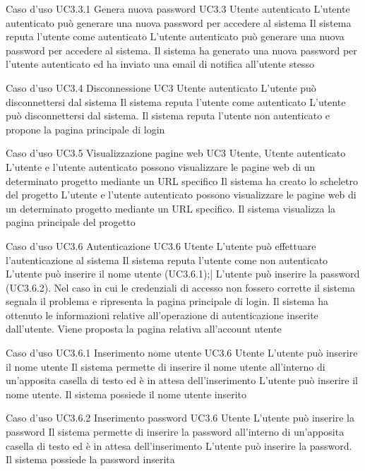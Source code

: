 \UCtitle
{Caso d'uso UC3.3.1}
{Genera nuova password}
\UC
{UC3.3}
{Utente autenticato}
{L'utente autenticato può generare una nuova password per accedere al sistema}
{Il sistema reputa l'utente come autenticato}
\scenario
{L'utente autenticato può generare una nuova password per accedere al sistema.}
\post
{Il sistema ha generato una nuova password per l'utente autenticato ed ha inviato una email di notifica all'utente stesso}

\UCtitle
{Caso d'uso UC3.4}
{Disconnessione}
\UC
{UC3}
{Utente autenticato}
{L'utente può disconnettersi dal sistema}
{Il sistema reputa l'utente come autenticato}
\scenario
{L'utente può disconnettersi dal sistema.}
\post
{Il sistema reputa l'utente non autenticato e propone la pagina principale di login}


\UCtitle
{Caso d'uso UC3.5}
{Visualizzazione pagine web}
\UC
{UC3}
{Utente, Utente autenticato}
{L'utente e l'utente autenticato possono visualizzare le pagine web di un determinato progetto mediante un URL specifico}
{Il sistema ha creato lo scheletro del progetto}
\scenario
{L'utente e l'utente autenticato possono visualizzare le pagine web di un determinato progetto mediante un URL specifico.}
\post
{Il sistema visualizza la pagina principale del progetto}


\UCtitle
{Caso d'uso UC3.6}
{Autenticazione}
\UC
{UC3.6}
{Utente}
{L'utente può effettuare l'autenticazione al sistema}
{Il sistema reputa l'utente come non autenticato}
\scenario
{L'utente può inserire il nome utente (UC3.6.1);|
L'utente può inserire la password (UC3.6.2).
}
\scenarioAlt
{Nel caso in cui le credenziali di accesso non fossero corrette il sistema segnala il problema e ripresenta la pagina principale di login.
}
\post
{Il sistema ha ottenuto le informazioni relative all'operazione di autenticazione inserite dall'utente. Viene proposta la pagina relativa all'account utente}


\UCtitle
{Caso d'uso UC3.6.1}
{Inserimento nome utente}
\UC
{UC3.6}
{Utente}
{L'utente può inserire il nome utente}
{Il sistema permette di inserire il nome utente all'interno di un'apposita casella di testo ed è in attesa dell'inserimento}
\scenario
{L'utente può inserire il nome utente.}
\post
{Il sistema possiede il nome utente inserito}

\UCtitle
{Caso d'uso UC3.6.2}
{Inserimento password}
\UC
{UC3.6}
{Utente}
{L'utente può inserire la password}
{Il sistema permette di inserire la password all'interno di un'apposita casella di testo ed è in attesa dell'inserimento}
\scenario
{L'utente può inserire la password.}
\post
{Il sistema possiede la password inserita}

